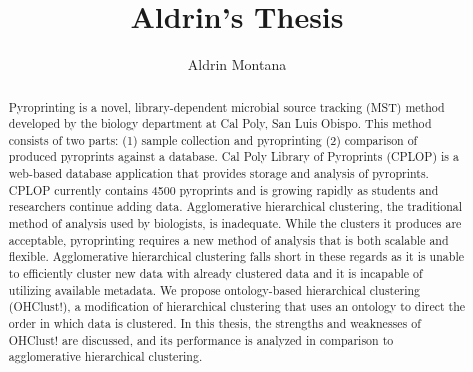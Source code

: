 \documentclass[12pt]{ucthesis}
\begin{document}
\title{Aldrin's Thesis}
\author{Aldrin Montana}



\maketitle
\begin{frontmatter}
   \copyrightpage

   \committeemembershippage

   \begin{abstract}
      Pyroprinting is a novel, library-dependent microbial source tracking
      (MST) method developed by the biology department at Cal Poly, San Luis
      Obispo. This method consists of two parts: (1) sample collection and
      pyroprinting (2) comparison of produced pyroprints against a database.
      Cal Poly Library of Pyroprints (CPLOP) is a web-based database
      application that provides storage and analysis of pyroprints. CPLOP
      currently contains 4500 pyroprints and is growing rapidly as students and
      researchers continue adding data. Agglomerative hierarchical clustering,
      the traditional method of analysis used by biologists, is inadequate.
      While the clusters it produces are acceptable, pyroprinting requires a
      new method of analysis that is both scalable and flexible. Agglomerative
      hierarchical clustering falls short in these regards as it is unable to
      efficiently cluster new data with already clustered data and it is
      incapable of utilizing available metadata. We propose ontology-based
      hierarchical clustering (\textsf{OHClust!}), a modification of
      hierarchical clustering that uses an ontology to direct the order in
      which data is clustered. In this thesis, the strengths and weaknesses of
      \textsf{OHClust!} are discussed, and its performance is analyzed in
      comparison to agglomerative hierarchical clustering.
   \end{abstract}


\end{frontmatter}
\end{document}
